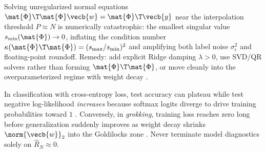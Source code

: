 \documentclass[../../../../master.tex]{subfiles}
\begin{document}
\begin{pitfall}
\label{pit:biasvar:cusp}
Solving unregularized normal equations $\mat{\Phi}\T\mat{\Phi}\vecb{w} = \mat{\Phi}\T\vecb{y}$ near the interpolation threshold $P \approx N$ is numerically catastrophic: the smallest singular value $s_{\min}(\mat{\Phi}) \to 0$, inflating the condition number $\kappa(\mat{\Phi}\T\mat{\Phi}) = (s_{\max}/s_{\min})^2$ and amplifying both label noise $\sigma_\epsilon^2$ and floating-point roundoff. Remedy: add explicit Ridge damping $\lambda > 0$, use SVD/QR solvers rather than forming $\mat{\Phi}\T\mat{\Phi}$, or move cleanly into the overparameterized regime with weight decay .
\end{pitfall}

\begin{pitfall}
\label{pit:biasvar:zero_loss}
In classification with cross-entropy loss, test accuracy can plateau while test negative log-likelihood \emph{increases} because softmax logits diverge to drive training probabilities toward $1$ . Conversely, in \emph{grokking}, training loss reaches zero long before generalization suddenly improves as weight decay shrinks $\norm{\vecb{w}}_2$ into the Goldilocks zone . Never terminate model diagnostics solely on $\hat{R}_N \approx 0$.
\end{pitfall}
\end{document}
